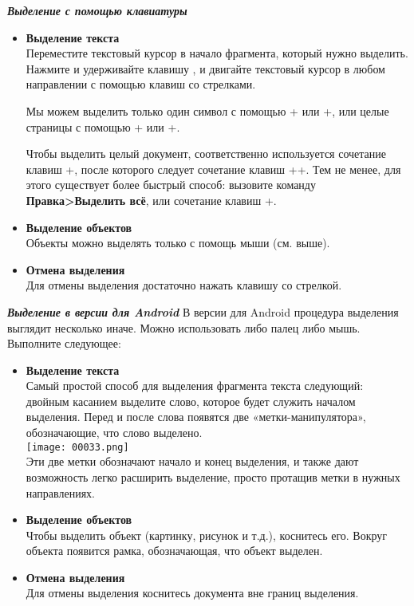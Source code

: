 \documentclass[a4paper,10pt]{article}
\begin{document}
\textbf{\textit{Выделение с помощью клавиатуры}}

\begin{itemize}
 \item \textbf{Выделение текста}\\
 Переместите текстовый курсор в начало фрагмента, который нужно выделить. Нажмите и удерживайте клавишу , и двигайте текстовый курсор в любом направлении с помощью клавиш со стрелками.
 
Мы можем выделить только один символ с помощью +\keys{\arrowkeyleft} или +\keys{\arrowkeyright}, или целые страницы с помощью + или +.

Чтобы выделить целый документ, соответственно используется сочетание клавиш +, после которого следует сочетание клавиш ++. Тем не менее, для этого существует более быстрый способ: вызовите команду \textbf{Правка>Выделить всё}, или сочетание клавиш +.
\item \textbf{Выделение объектов}\\
Объекты можно выделять только с помощь мыши (см. выше).
\item \textbf{Отмена выделения}\\
Для отмены выделения достаточно нажать клавишу со стрелкой.
\end{itemize}

\textbf{\textit{Выделение в версии для Android}}
В версии для Android процедура выделения выглядит несколько иначе. Можно использовать либо палец либо мышь. Выполните следующее:
\begin{itemize}
 \item \textbf{Выделение текста}\\
Самый простой способ для выделения фрагмента текста следующий:\\
двойным касанием выделите слово, которое будет служить началом выделения. Перед и после слова появятся две «метки-манипулятора», обозначающие, что слово выделено.\\
\texttt{[image: 00033.png]}\\
Эти две метки обозначают начало и конец выделения, и также дают возможность легко расширить выделение, просто протащив метки в нужных направлениях.
\item \textbf{Выделение объектов}\\
Чтобы выделить объект (картинку, рисунок и т.д.), коснитесь его. Вокруг объекта появится рамка, обозначающая, что объект выделен.
\item \textbf{Отмена выделения}\\
Для отмены выделения коснитесь документа вне границ выделения.
\end{itemize}
\end{document}
